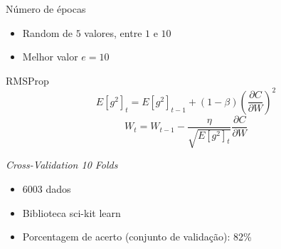 \documentclass[xcolor=dvipsnames]{beamer}
\begin{document}
        \begin{frame}{Número de épocas}
            \begin{itemize}
                \item Random de $5$ valores, entre $1$ e $10$
                \item Melhor valor $e = 10$
            \end{itemize}
        \end{frame}
        \begin{frame}{RMSProp}
            \[\ E[g^2]_t = E[g^2]_{t-1} + (1-\beta)\left(\frac{\partial{ C}}{\partial{ W}}\right)^2\]
            \[\ W_t = W_{t-1} - \frac{\eta}{\sqrt{E[g^2]_t}}\frac{\partial{ C}}{\partial{ W}}\]
        \end{frame}

        \begin{frame}{\textit{Cross-Validation 10 Folds}}
            \begin{itemize}
                \item $6003$ dados
                \item Biblioteca sci-kit learn
                \item Porcentagem de acerto (conjunto de validação): 82\%
            \end{itemize}
        \end{frame}
\end{document}
